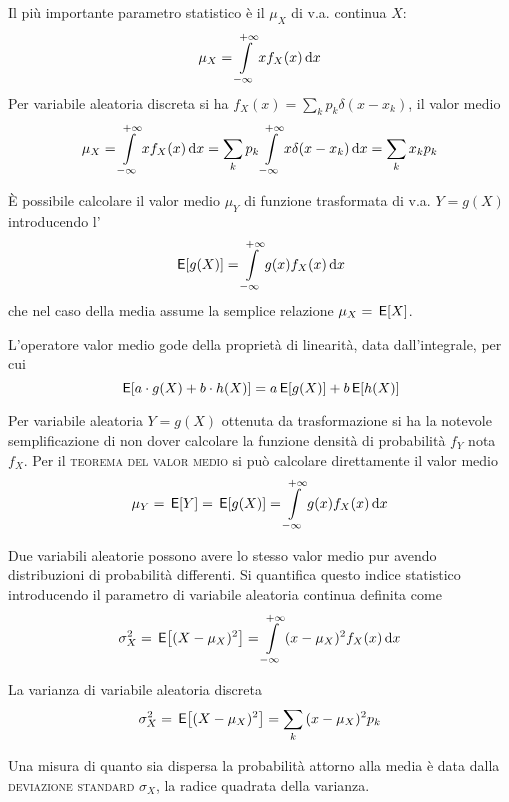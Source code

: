 Il più importante parametro statistico è il  $\mu_X$ di v.a. continua $X$:
\begin{equation}\label{eq:v_a_media}
\mu_X=\int\limits_{-\infty}^{+\infty}{x f_X(x)}{\,\mathop{}\!\mathrm{d}{x}}
\end{equation}
Per variabile aleatoria discreta si ha $f_X(x)=\sum_k p_k\delta(x-x_k)$, il valor medio
\begin{equation}\label{eq:v_a_discreta_media}
\mu_X=\int\limits_{-\infty}^{+\infty}{x f_X(x)}{\,\mathop{}\!\mathrm{d}{x}}=\sum_k p_k \int\limits_{-\infty}^{+\infty}{x \delta(x-x_k)}{\,\mathop{}\!\mathrm{d}{x}}=\sum_k x_k p_k
\end{equation}

\`{E} possibile calcolare il valor medio $\mu_Y$ di funzione trasformata di v.a. $Y=g(X)$ introducendo l'
\begin{equation}
\,{\operatorname{\mathsf{E}}}\!\left[{g(X)}\right]=\int\limits_{-\infty}^{+\infty}{g(x)f_X(x)}{\,\mathop{}\!\mathrm{d}{x}}
\end{equation}
che nel caso della media assume la semplice relazione $\mu_X=\,{\operatorname{\mathsf{E}}}\!\left[{X}\right]$.

L'operatore valor medio gode della proprietà di linearità, data dall'integrale, per cui 
\begin{equation}\,{\operatorname{\mathsf{E}}}\!\left[{a\cdot g(X)+b\cdot h(X)}\right]=a \,{\operatorname{\mathsf{E}}}\!\left[{g(X)}\right]+b \,{\operatorname{\mathsf{E}}}\!\left[{h(X)}\right]\end{equation}

Per variabile aleatoria $Y=g(X)$ ottenuta da trasformazione si ha la notevole semplificazione di non dover calcolare la funzione densità di probabilità $f_Y$ nota $f_X$.
Per il \textsc{teorema del valor medio} si può calcolare direttamente il valor medio
\begin{equation}\label{eq:teo_valor_medio}
\mu_Y=\,{\operatorname{\mathsf{E}}}\!\left[{Y}\right]=\,{\operatorname{\mathsf{E}}}\!\left[{g(X)}\right]=\int\limits_{-\infty}^{+\infty}{g(x) f_X(x)}{\,\mathop{}\!\mathrm{d}{x}}
\end{equation}

Due variabili aleatorie possono avere lo stesso valor medio pur avendo distribuzioni di probabilità differenti. Si quantifica questo indice statistico introducendo il parametro  di variabile aleatoria continua definita come
\begin{equation}\label{eq:v_a_varianza}
\sigma^2_X=\,{\operatorname{\mathsf{E}}}\!\left[{(X-\mu_X)^2}\right]=\int\limits_{-\infty}^{+\infty}{(x-\mu_X)^2 f_X(x)}{\,\mathop{}\!\mathrm{d}{x}}
\end{equation}

La varianza di variabile aleatoria discreta
\begin{equation}\label{eq:v_a_varianza_discreta}
\sigma^2_X=\,{\operatorname{\mathsf{E}}}\!\left[{(X-\mu_X)^2}\right]=\sum_k {(x-\mu_X)^2 p_k}
\end{equation}

Una misura di quanto sia dispersa la probabilità attorno alla media è data dalla \textsc{deviazione standard} $\sigma_X$, la radice quadrata della varianza.\\

